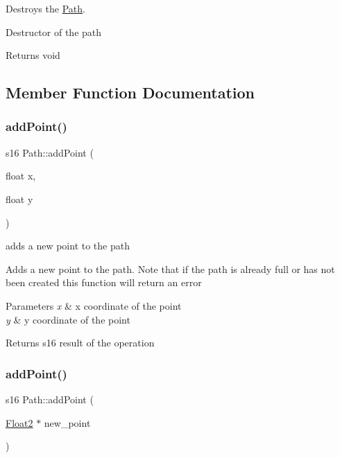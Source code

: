Destroys the \mbox{\hyperlink{class_path}{Path}}. 

Destructor of the path

\begin{DoxyReturn}{Returns}
void 
\end{DoxyReturn}


\subsection{Member Function Documentation}
\mbox{\label{class_path_aec0977970beeaa279c2c3f152aee0f88}} 
\subsubsection{\texorpdfstring{add\+Point()}{addPoint()}\hspace{0.1cm}{\footnotesize\ttfamily [1/2]}}
{\footnotesize\ttfamily s16 Path\+::add\+Point (\begin{DoxyParamCaption}\item[{float}]{x,  }\item[{float}]{y }\end{DoxyParamCaption})}



adds a new point to the path 

Adds a new point to the path. Note that if the path is already full or has not been created this function will return an error


\begin{DoxyParams}{Parameters}
{\em x} & x coordinate of the point \\
\hline
{\em y} & y coordinate of the point \\
\hline
\end{DoxyParams}
\begin{DoxyReturn}{Returns}
s16 result of the operation 
\end{DoxyReturn}
\mbox{\label{class_path_a114453983549b6be3d27788272d26b2a}} 
\subsubsection{\texorpdfstring{add\+Point()}{addPoint()}\hspace{0.1cm}{\footnotesize\ttfamily [2/2]}}
{\footnotesize\ttfamily s16 Path\+::add\+Point (\begin{DoxyParamCaption}\item[{\mbox{\hyperlink{class_float2}{Float2}} $\ast$}]{new\+\_\+point }\end{DoxyParamCaption})}



